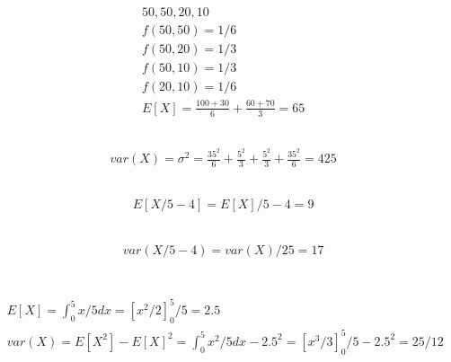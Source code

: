 \documentclass[a4paper]{article}
\begin{document}
\thispagestyle{fancy} %
{}

\section{}
\subsection{}
\begin{align*}
	& 50, 50, 20, 10 \\
	& f(50, 50) = 1/6 \\
	& f(50, 20) = 1/3 \\
	& f(50, 10) = 1/3 \\
	& f(20, 10) = 1/6 \\
	& E[X] = \frac{100+30}{6} + \frac{60+70}{3} = 65
\end{align*}

\subsection{}
\begin{align*}
	& var(X) = \sigma^2 = \frac{35^2}{6}+\frac{5^2}{3} +\frac{5^2}{3} + \frac{35^2}{6} = 425
\end{align*}

\subsection{}
\begin{align*}
	& E[X/5 - 4] = E[X]/5 - 4 = 9
\end{align*}

\subsection{}
\begin{align*}
	& var(X/5-4) = var(X)/25 = 17
\end{align*}


\section{}
\subsection{}
\begin{align*}
	& E[X] = \int_0^5 x/5 dx = [x^2/2]_0^5/5 =  2.5 \\
	& var(X) = E[X^2] - E[X]^2 = \int_0^5 x^2/5 dx - 2.5^2 = [x^3/3]_0^5/5 - 2.5^2  = 25/12 \\
\end{align*}
\end{document}
